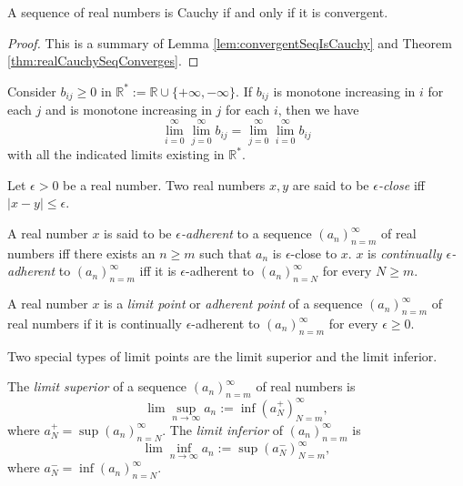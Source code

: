 \begin{thm}
  \label{thm:completenessOfRealNumbers}
  A sequence of real numbers is Cauchy
  if and only if it is convergent.
\end{thm}
\begin{proof}
  This is a summary of
  Lemma \ref{lem:convergentSeqIsCauchy}
  and Theorem \ref{thm:realCauchySeqConverges}.
\end{proof}

\begin{thm}
  \label{thm:interchangeOfLimits}
  Consider $b_{ij}\ge 0$ in
  $\mathbb{R}^*:=\mathbb{R}\cup\{+\infty, -\infty\}$.
  If $b_{ij}$ is monotone increasing in $i$ for each $j$
  and is monotone increasing in $j$ for each $i$,
  then we have
  \begin{equation}
    \label{eq:interchangeOfLimits}
    \lim_{i=0}^{\infty} \lim_{j=0}^{\infty} b_{ij}
    = \lim_{j=0}^{\infty} \lim_{i=0}^{\infty} b_{ij}
  \end{equation}
  with all the indicated limits existing in $\mathbb{R}^*$.
\end{thm}


\begin{defn}
  Let $\epsilon>0$ be a real number.
  Two real numbers $x,y$ are said to be \emph{$\epsilon$-close}
  iff $|x-y|\le \epsilon$.
\end{defn}

\begin{defn}
  A real number $x$ is said to be \emph{$\epsilon$-adherent}
  to a sequence $(a_n)_{n=m}^{\infty}$ of real numbers
  iff there exists an $n\ge m$ such that
  $a_n$ is $\epsilon$-close to $x$.
  $x$ is \emph{continually $\epsilon$-adherent} to
  $(a_n)_{n=m}^{\infty}$
  iff it is $\epsilon$-adherent to $(a_n)_{n=N}^{\infty}$
  for every $N\ge m$.
\end{defn}

\begin{defn}
  \label{def:limitPointInR}
  A real number $x$ is a \emph{limit point} or \emph{adherent point}
  of a sequence $(a_n)_{n=m}^{\infty}$ of real numbers
  if it is continually $\epsilon$-adherent to
  $(a_n)_{n=m}^{\infty}$ for every $\epsilon\ge 0$.
\end{defn}

\begin{rem}
  Two special types of limit points are the limit superior
  and the limit inferior.
\end{rem}

\begin{defn}
  The \emph{limit superior} of a sequence $(a_n)_{n=m}^{\infty}$ of
  real numbers
  is
  \begin{equation}
    \label{eq:limsup}
    \lim \sup_{n\rightarrow \infty} a_n := \inf (a_N^+)_{N=m}^{\infty}, 
  \end{equation}
  where $a_N^+=\sup(a_n)_{n=N}^{\infty}$.
  The \emph{limit inferior} of $(a_n)_{n=m}^{\infty}$ is
  \begin{equation}
    \label{eq:liminf}
    \lim \inf_{n\rightarrow \infty} a_n := \sup (a_N^-)_{N=m}^{\infty}, 
  \end{equation}
  where $a_N^-=\inf(a_n)_{n=N}^{\infty}$.
\end{defn}

